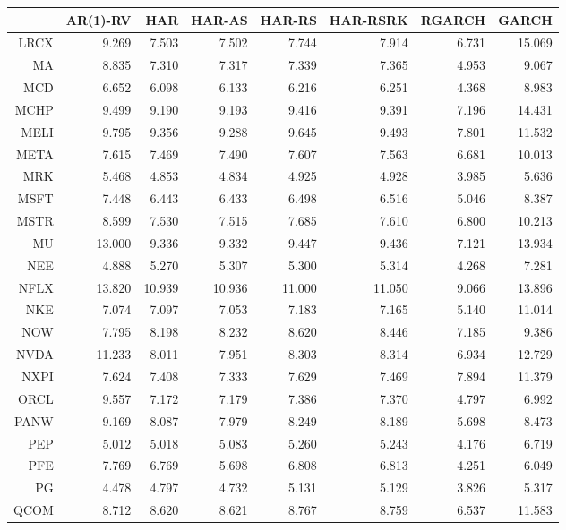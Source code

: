 \begin{table}[ht]
\centering
\begin{tabular}{rrrrrrrr}
  \hline
 & AR(1)-RV & HAR & HAR-AS & HAR-RS & HAR-RSRK & RGARCH & GARCH \\ 
  \hline
LRCX & 9.269 & 7.503 & 7.502 & 7.744 & 7.914 & 6.731 & 15.069 \\ 
  MA & 8.835 & 7.310 & 7.317 & 7.339 & 7.365 & 4.953 & 9.067 \\ 
  MCD & 6.652 & 6.098 & 6.133 & 6.216 & 6.251 & 4.368 & 8.983 \\ 
  MCHP & 9.499 & 9.190 & 9.193 & 9.416 & 9.391 & 7.196 & 14.431 \\ 
  MELI & 9.795 & 9.356 & 9.288 & 9.645 & 9.493 & 7.801 & 11.532 \\ 
  META & 7.615 & 7.469 & 7.490 & 7.607 & 7.563 & 6.681 & 10.013 \\ 
  MRK & 5.468 & 4.853 & 4.834 & 4.925 & 4.928 & 3.985 & 5.636 \\ 
  MSFT & 7.448 & 6.443 & 6.433 & 6.498 & 6.516 & 5.046 & 8.387 \\ 
  MSTR & 8.599 & 7.530 & 7.515 & 7.685 & 7.610 & 6.800 & 10.213 \\ 
  MU & 13.000 & 9.336 & 9.332 & 9.447 & 9.436 & 7.121 & 13.934 \\ 
  NEE & 4.888 & 5.270 & 5.307 & 5.300 & 5.314 & 4.268 & 7.281 \\ 
  NFLX & 13.820 & 10.939 & 10.936 & 11.000 & 11.050 & 9.066 & 13.896 \\ 
  NKE & 7.074 & 7.097 & 7.053 & 7.183 & 7.165 & 5.140 & 11.014 \\ 
  NOW & 7.795 & 8.198 & 8.232 & 8.620 & 8.446 & 7.185 & 9.386 \\ 
  NVDA & 11.233 & 8.011 & 7.951 & 8.303 & 8.314 & 6.934 & 12.729 \\ 
  NXPI & 7.624 & 7.408 & 7.333 & 7.629 & 7.469 & 7.894 & 11.379 \\ 
  ORCL & 9.557 & 7.172 & 7.179 & 7.386 & 7.370 & 4.797 & 6.992 \\ 
  PANW & 9.169 & 8.087 & 7.979 & 8.249 & 8.189 & 5.698 & 8.473 \\ 
  PEP & 5.012 & 5.018 & 5.083 & 5.260 & 5.243 & 4.176 & 6.719 \\ 
  PFE & 7.769 & 6.769 & 5.698 & 6.808 & 6.813 & 4.251 & 6.049 \\ 
  PG & 4.478 & 4.797 & 4.732 & 5.131 & 5.129 & 3.826 & 5.317 \\ 
  QCOM & 8.712 & 8.620 & 8.621 & 8.767 & 8.759 & 6.537 & 11.583 \\ 

\end{tabular}
\end{table}
